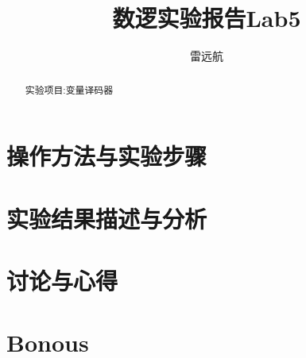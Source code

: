 \documentclass{article}
\title{数逻实验报告Lab5}
\author{雷远航}
\begin{document}
\maketitle

\begin{abstract}
实验项目:变量译码器
\end{abstract}

\section{操作方法与实验步骤}

\section{实验结果描述与分析}

\section{讨论与心得}

\section{Bonous}
\end{document}
